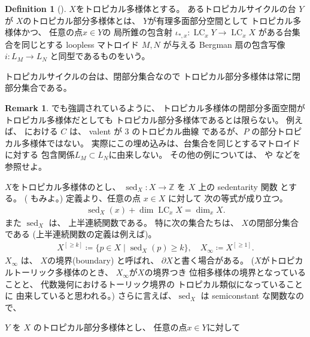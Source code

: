 \documentclass[a4paper,dvipdfmx,reqno,12pt]{amsart}
\theoremstyle{definition}
\newtheorem{definition}[theorem]{Definition}
\newtheorem{remark}[theorem]{Remark}
\newcommand{\deq}{\coloneqq}
\newcommand{\opn}[1]{\operatorname{#1}}
\numberwithin{equation}{section}
\begin{document}
\begin{definition}[{\cite[Definition 2.14]{demedrano2023chern}}]
$X$をトロピカル多様体とする。
あるトロピカルサイクルの台 $Y$ が
$X$のトロピカル部分多様体とは、
$Y$が有理多面部分空間として
トロピカル多様体かつ、
任意の点$x\in Y$の
局所錐の包含射
$\iota_{*,x}\colon \opn{LC}_x Y\to 
\opn{LC}_x X$
がある台集合を同じとする loopless マトロイド
$M,N$ が与える Bergman 扇の包含写像
$i \colon L_M\to L_N$
と同型であるものをいう。
\end{definition}

トロピカルサイクルの台は、閉部分集合なので
トロピカル部分多様体は常に閉部分集合である。

\begin{remark}
\cite[Example 2.15]{demedrano2023chern}でも強調されているように、
トロピカル多様体の閉部分多面空間がトロピカル多様体だとしても
トロピカル部分多様体であるとは限らない。
例えば、
\cite[Example 2.21]{shaw2015tropical}
における $C$ は、 valent が $3$ のトロピカル曲線
であるが、$P$ の部分トロピカル多様体ではない。
実際にこの埋め込みは、台集合を同じとするマトロイドに対する
包含関係$L_M\subset L_N$に由来しない。
その他の例については、
\cite{MR2594592} や \cite{MR3339531}
などを参照せよ。


\end{remark}

$X$をトロピカル多様体のとし、
$\opn{sed}_X\colon 
X\to \mathbb{Z}$ を
$X$ 上の sedentarity 関数
\cite[Definition 7.2.6]{mikhalkin2018tropical}
とする。
(\cite[Definition 2.4]{demedrano2023chern}
もみよ。)
定義より、任意の点 $x\in X$ に対して
次の等式が成り立つ。
\begin{align}
\opn{sed}_X(x)+\dim \opn{LC}_x X=\dim_x X.
\end{align}
また $\opn{sed}_X$ は、
上半連続関数である。
特に次の集合たちは、
$X$の閉部分集合である
(上半連続関数の定義は例えば\cite[p.287]{MR463157})。
\begin{align}
X^{[\geq k]}\deq \{p\in X\mid \opn{sed}_X(p)\geq k\},
\quad 
X_{\infty}\deq X^{[\geq 1]}.
\end{align}
$X_{\infty}$ は、
$X$の境界(boundary)
と呼ばれ、
$\partial X$と書く場合がある。
($X$がトロピカルトーリック多様体のとき、
$X_{\infty}$が$X$の境界つき
位相多様体の境界となっていることと、
代数幾何におけるトーリック境界の
トロピカル類似になっていることに
由来していると思われる。)
さらに言えば、$\opn{sed}_X$ は
semiconstant な関数なので、




$Y$ を $X$ 
のトロピカル部分多様体とし、
任意の点$x\in Y$に対して
\end{document}
